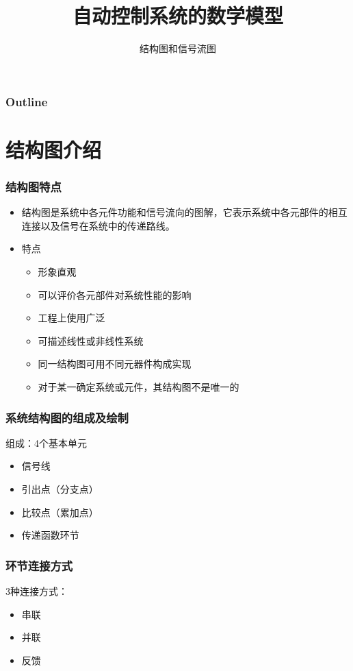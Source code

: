\documentclass{beamer}
\subtitle{结构图和信号流图}
\title{自动控制系统的数学模型}
\author{}
\date{}
\begin{document}
\maketitle

\begin{frame}
\frametitle{Outline}
\setcounter{tocdepth}{3}
\tableofcontents
\end{frame}














\section{结构图介绍}
\label{sec-1}
\begin{frame}
\frametitle{结构图特点}
\label{sec-1-1}

\begin{itemize}
\item <2->结构图是系统中各元件功能和信号流向的图解，它表示系统中各元部件的相互连接以及信号在系统中的传递路线。
\item <3->特点
\begin{itemize}
\item <4-> 形象直观
\item <5-> 可以评价各元部件对系统性能的影响
\item <6-> 工程上使用广泛
\item <7-> 可描述线性或非线性系统
\item <8-> 同一结构图可用不同元器件构成实现
\item <9-> 对于某一确定系统或元件，其结构图不是唯一的
\end{itemize}
\end{itemize}
\end{frame}
\begin{frame}
\frametitle{系统结构图的组成及绘制}
\label{sec-1-2}

组成：4个基本单元
\begin{itemize}
\item <2-> 信号线
\item <3-> 引出点（分支点）
\item <4-> 比较点（累加点）
\item <5-> 传递函数环节
\end{itemize}
\end{frame}
\begin{frame}
\frametitle{环节连接方式}
\label{sec-1-3}

 3种连接方式：
\begin{itemize}
\item <2-> 串联
\item <3-> 并联
\item <4-> 反馈
\end{itemize}
\end{frame}
\end{document}
